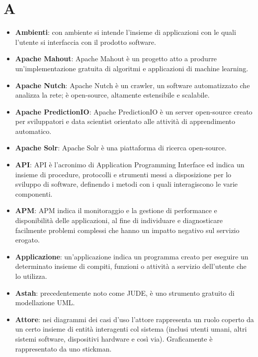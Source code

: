 \documentclass[a4paper, oneside, openany, dvipsnames, table]{article}
\begin{document}
\copertina{}

\newpage
\tableofcontents
\newpage
\section{A}
\begin{itemize}
\item \textbf{Ambienti}: con ambiente si intende l'insieme di applicazioni con le quali l'utente si  interfaccia con il prodotto software.
\item \textbf{Apache Mahout}: Apache Mahout è un progetto atto a produrre un'implementazione gratuita di algoritmi e applicazioni di machine learning.
\item \textbf{Apache Nutch}: Apache Nutch è un crawler, un software automatizzato che analizza la rete; è open-source, altamente estensibile e scalabile.
\item \textbf{Apache PredictionIO}: Apache PredictionIO è un server open-source creato per sviluppatori e data scientist orientato alle attività di apprendimento automatico.
\item \textbf{Apache Solr}: Apache Solr è una piattaforma di ricerca open-source.
\item \textbf{API}: API è l'acronimo di Application Programming Interface ed indica un insieme di procedure, protocolli e strumenti messi a disposizione per lo sviluppo di software, definendo i metodi con i quali interagiscono le varie componenti.
\item \textbf{APM}: APM indica il monitoraggio e la gestione di performance e disponibilità delle applicazioni, al fine di individuare e diagnosticare facilmente problemi complessi che hanno un impatto negativo sul servizio erogato.
\item \textbf{Applicazione}: un'applicazione indica un programma creato per eseguire un determinato insieme di compiti, funzioni o attività a servizio dell'utente che lo utilizza.
\item \textbf{Astah}: precedentemente noto come JUDE, è uno strumento gratuito di modellazione UML.
\item \textbf{Attore}: nei diagrammi dei casi d'uso l'attore rappresenta un ruolo coperto da un certo insieme di entità interagenti col sistema (inclusi utenti umani, altri sistemi software, dispositivi hardware e così via). Graficamente è rappresentato da uno stickman.
\end{itemize}
\end{document}

